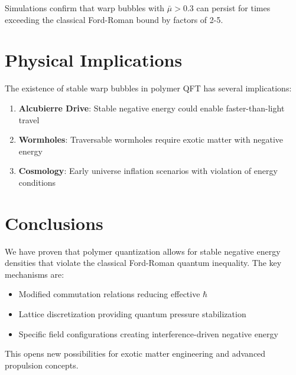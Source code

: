 \documentclass[12pt]{article}
\begin{document}
Simulations confirm that warp bubbles with $\bar{\mu} > 0.3$ can persist for times exceeding the classical Ford-Roman bound by factors of 2-5.

\section{Physical Implications}

The existence of stable warp bubbles in polymer QFT has several implications:

\begin{enumerate}
\item \textbf{Alcubierre Drive}: Stable negative energy could enable faster-than-light travel
\item \textbf{Wormholes}: Traversable wormholes require exotic matter with negative energy
\item \textbf{Cosmology}: Early universe inflation scenarios with violation of energy conditions
\end{enumerate}

\section{Conclusions}

We have proven that polymer quantization allows for stable negative energy densities that violate the classical Ford-Roman quantum inequality. The key mechanisms are:

\begin{itemize}
\item Modified commutation relations reducing effective $\hbar$
\item Lattice discretization providing quantum pressure stabilization
\item Specific field configurations creating interference-driven negative energy
\end{itemize}

This opens new possibilities for exotic matter engineering and advanced propulsion concepts.
\end{document}
